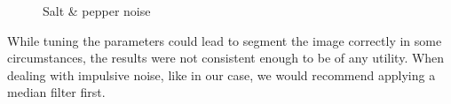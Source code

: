 \begin{figure}[!hbt]
\centering   
{}

\caption{Salt \& pepper noise}
\label{fig:salt-pepper}
\end{figure}

While tuning the parameters could lead to segment the image correctly in some circumstances, the results were not consistent enough to be of any utility. When dealing with impulsive noise, like in our case, we would recommend applying a median filter first.
